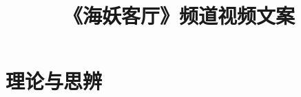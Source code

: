 \documentclass[b5paper,11pt]{ctexbook}
\title{《海妖客厅》频道视频文案}
\begin{document}
    \maketitle
    
    \part{理论与思辨}\label{part:theories}
    

    
    
\end{document}
